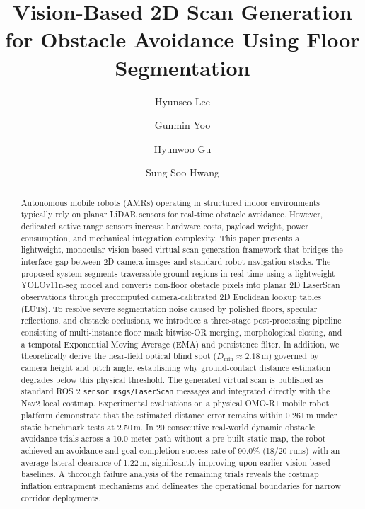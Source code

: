 \documentclass[preprint,12pt]{elsarticle}
\begin{document}
\begin{frontmatter}

\title{Vision-Based 2D Scan Generation for Obstacle Avoidance Using Floor Segmentation}

\author[inst1]{Hyunseo Lee}
\author[inst1]{Gunmin Yoo}
\author[inst1]{Hyunwoo Gu}
\author[inst1]{Sung Soo Hwang}



\begin{abstract}
Autonomous mobile robots (AMRs) operating in structured indoor environments typically rely on planar LiDAR sensors for real-time obstacle avoidance. However, dedicated active range sensors increase hardware costs, payload weight, power consumption, and mechanical integration complexity. This paper presents a lightweight, monocular vision-based virtual scan generation framework that bridges the interface gap between 2D camera images and standard robot navigation stacks. The proposed system segments traversable ground regions in real time using a lightweight YOLOv11n-seg model and converts non-floor obstacle pixels into planar 2D LaserScan observations through precomputed camera-calibrated 2D Euclidean lookup tables (LUTs). To resolve severe segmentation noise caused by polished floors, specular reflections, and obstacle occlusions, we introduce a three-stage post-processing pipeline consisting of multi-instance floor mask bitwise-OR merging, morphological closing, and a temporal Exponential Moving Average (EMA) and persistence filter. In addition, we theoretically derive the near-field optical blind spot ($D_{\min} \approx 2.18$\,m) governed by camera height and pitch angle, establishing why ground-contact distance estimation degrades below this physical threshold. The generated virtual scan is published as standard ROS 2 \texttt{sensor\_msgs/LaserScan} messages and integrated directly with the Nav2 local costmap. Experimental evaluations on a physical OMO-R1 mobile robot platform demonstrate that the estimated distance error remains within 0.261\,m under static benchmark tests at 2.50\,m. In 20 consecutive real-world dynamic obstacle avoidance trials across a 10.0-meter path without a pre-built static map, the robot achieved an avoidance and goal completion success rate of 90.0\% (18/20 runs) with an average lateral clearance of 1.22\,m, significantly improving upon earlier vision-based baselines. A thorough failure analysis of the remaining trials reveals the costmap inflation entrapment mechanisms and delineates the operational boundaries for narrow corridor deployments.
\end{abstract}


\end{frontmatter}
\end{document}
